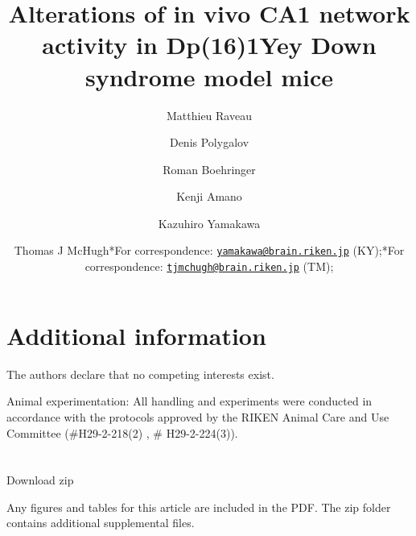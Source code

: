 \documentclass[]{article}
\title{Alterations of in vivo CA1 network activity in Dp(16)1Yey Down syndrome
model mice}
\author{Matthieu Raveau \and Denis Polygalov \and Roman Boehringer \and Kenji Amano \and Kazuhiro Yamakawa \and Thomas J McHugh*For correspondence:
\href{mailto:yamakawa@brain.riken.jp}{\nolinkurl{yamakawa@brain.riken.jp}}
(KY);*For correspondence:
\href{mailto:tjmchugh@brain.riken.jp}{\nolinkurl{tjmchugh@brain.riken.jp}}
(TM);}
\date{}
\begin{document}
\maketitle

\hypertarget{s1}{%
\section{Additional information}\label{s1}}

The authors declare that no competing interests exist.

Animal experimentation: All handling and experiments were conducted in
accordance with the protocols approved by the RIKEN Animal Care and Use
Committee (\#H29-2-218(2) , \# H29-2-224(3)).

\section{}

Download zip

Any figures and tables for this article are included in the PDF. The zip
folder contains additional supplemental files.
\end{document}
